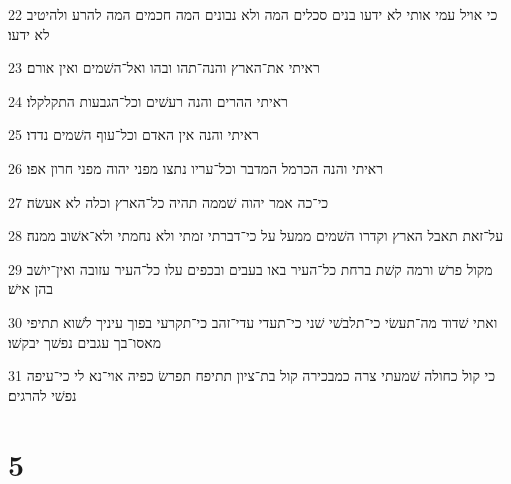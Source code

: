 \par 22 כי אויל עמי אותי לא ידעו בנים סכלים המה ולא נבונים המה חכמים המה להרע ולהיטיב לא ידעו׃
\par 23 ראיתי את־הארץ והנה־תהו ובהו ואל־השׁמים ואין אורם׃
\par 24 ראיתי ההרים והנה רעשׁים וכל־הגבעות התקלקלו׃
\par 25 ראיתי והנה אין האדם וכל־עוף השׁמים נדדו׃
\par 26 ראיתי והנה הכרמל המדבר וכל־עריו נתצו מפני יהוה מפני חרון אפו׃
\par 27 כי־כה אמר יהוה שׁממה תהיה כל־הארץ וכלה לא אעשׂה׃
\par 28 על־זאת תאבל הארץ וקדרו השׁמים ממעל על כי־דברתי זמתי ולא נחמתי ולא־אשׁוב ממנה׃
\par 29 מקול פרשׁ ורמה קשׁת ברחת כל־העיר באו בעבים ובכפים עלו כל־העיר עזובה ואין־יושׁב בהן אישׁ׃
\par 30 ואתי שׁדוד מה־תעשׂי כי־תלבשׁי שׁני כי־תעדי עדי־זהב כי־תקרעי בפוך עיניך לשׁוא תתיפי מאסו־בך עגבים נפשׁך יבקשׁו׃
\par 31 כי קול כחולה שׁמעתי צרה כמבכירה קול בת־ציון תתיפח תפרשׂ כפיה אוי־נא לי כי־עיפה נפשׁי להרגים׃

\chapter{5}

